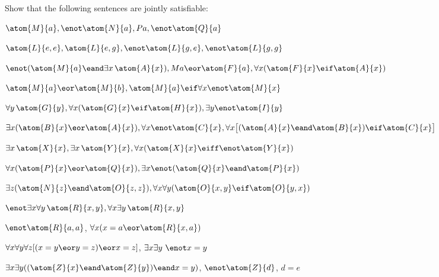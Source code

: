\problempart
Show that the following sentences are jointly satisfiable:
\begin{compactlist}
\item $\atom{M}{a}, \enot \atom{N}{a}, Pa, \enot \atom{Q}{a}$
\item $\atom{L}{e,e}, \atom{L}{e,g}, \enot \atom{L}{g,e}, \enot \atom{L}{g,g}$
\item $\enot (\atom{M}{a} \eand \exists x\,\atom{A}{x}), Ma \eor \atom{F}{a}, \forall x(\atom{F}{x} \eif \atom{A}{x})$
\item $\atom{M}{a} \eor \atom{M}{b}, \atom{M}{a} \eif \forall x \enot \atom{M}{x}$
\item $\forall y\,\atom{G}{y}, \forall x (\atom{G}{x} \eif \atom{H}{x}), \exists y \enot \atom{I}{y}$
\item $\exists x(\atom{B}{x} \eor \atom{A}{x}), \forall x \enot \atom{C}{x}, \forall x\bigl[(\atom{A}{x} \eand \atom{B}{x}) \eif \atom{C}{x}\bigr]$
\item $\exists x\,\atom{X}{x}, \exists x\,\atom{Y}{x}, \forall x(\atom{X}{x} \eiff \enot \atom{Y}{x})$
\item $\forall x(\atom{P}{x} \eor \atom{Q}{x}), \exists x\enot(\atom{Q}{x} \eand \atom{P}{x})$
\item $\exists z(\atom{N}{z} \eand \atom{O}{z,z}), \forall x\forall y(\atom{O}{x,y} \eif \atom{O}{y,x})$
\item $\enot \exists x \forall y\,\atom{R}{x,y}, \forall x \exists y\,\atom{R}{x,y}$
\item $\enot \atom{R}{a,a}$, $\forall x (x=a \eor \atom{R}{x,a})$

\item $\forall x\forall y\forall z[(x=y \eor y=z )\eor x=z]$, $\exists x\exists y\ \enot x= y$

\item $\exists x\exists y((\atom{Z}{x} \eand \atom{Z}{y} )\eand x=y)$, $\enot \atom{Z}{d}$, $d=e$
\end{compactlist}

